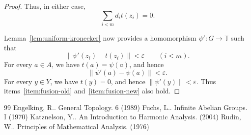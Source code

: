 \documentclass[10pt,a4paper]{amsart}
\newcommand{\T}{\mathbb T}
\begin{document}
\begin{proof}
Thus, in either case,
\[
\sum_{i<m}d_i t(z_i)=0.
\]

Lemma~\ref{lem:uniform-kronecker} now provides a homomorphism
$\psi':G\to\T$ such that
\[
\|\psi'(z_i)-t(z_i)\|<\varepsilon
\qquad(i<m).
\]
For every $a\in A$, we have $t(a)=\psi(a)$, and hence
\[
\|\psi'(a)-\psi(a)\|<\varepsilon.
\]
For every $y\in Y$, we have $t(y)=0$, and hence $\|\psi'(y)\|<\varepsilon$.
Thus items~\ref{item:fusion-old} and~\ref{item:fusion-new} also hold.
\end{proof}


\begin{thebibliography}{99}
 Engelking, R.. General Topology. 6 (1989)
 Fuchs, L.. Infinite Abelian Groups. I (1970)
 Katznelson, Y.. An Introduction to Harmonic Analysis. (2004)
 Rudin, W.. Principles of Mathematical Analysis. (1976)
\end{thebibliography}
\end{document}
